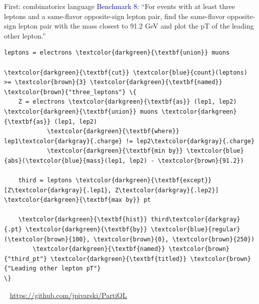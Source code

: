 \documentclass[aspectratio=169]{beamer}
\begin{document}
\begin{frame}[fragile]{First: combinatorics language}
\vspace{0.3 cm}
\textcolor{darkblue}{Benchmark 8}: ``For events with at least three leptons and a same-flavor opposite-sign lepton pair, find the same-flavor opposite-sign lepton pair with the mass closest to 91.2 GeV and plot the pT of the leading other lepton.''

\small
\vspace{0.2 cm}
\begin{Verbatim}[commandchars=\\\{\}]
leptons = electrons \textcolor{darkgreen}{\textbf{union}} muons

\textcolor{darkgreen}{\textbf{cut}} \textcolor{blue}{count}(leptons) >= \textcolor{brown}{3} \textcolor{darkgreen}{\textbf{named}} \textcolor{brown}{"three_leptons"} \{
    Z = electrons \textcolor{darkgreen}{\textbf{as}} (lep1, lep2) \textcolor{darkgreen}{\textbf{union}} muons \textcolor{darkgreen}{\textbf{as}} (lep1, lep2)
            \textcolor{darkgreen}{\textbf{where}} lep1\textcolor{darkgray}{.charge} != lep2\textcolor{darkgray}{.charge}
            \textcolor{darkgreen}{\textbf{min by}} \textcolor{blue}{abs}(\textcolor{blue}{mass}(lep1, lep2) - \textcolor{brown}{91.2})

    third = leptons \textcolor{darkgreen}{\textbf{except}} [Z\textcolor{darkgray}{.lep1}, Z\textcolor{darkgray}{.lep2}] \textcolor{darkgreen}{\textbf{max by}} pt

    \textcolor{darkgreen}{\textbf{hist}} third\textcolor{darkgray}{.pt} \textcolor{darkgreen}{\textbf{by}} \textcolor{blue}{regular}(\textcolor{brown}{100}, \textcolor{brown}{0}, \textcolor{brown}{250})
        \textcolor{darkgreen}{\textbf{named}} \textcolor{brown}{"third_pt"} \textcolor{darkgreen}{\textbf{titled}} \textcolor{brown}{"Leading other lepton pT"}
\}
\end{Verbatim}

\vspace{-0.1 cm}
\mbox{ } \hfill \textcolor{blue}{\underline{\url{https://github.com/jpivarski/PartiQL}}} \hfill \mbox{ }
\end{frame}
\end{document}
